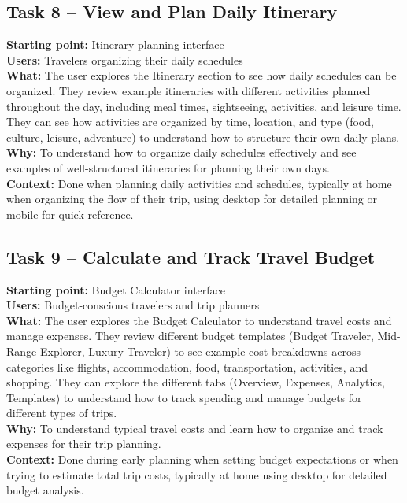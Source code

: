 \documentclass[11pt,a4paper]{article}
\begin{document}
\subsection*{Task 8 – View and Plan Daily Itinerary}
\textbf{Starting point:} Itinerary planning interface \\
\textbf{Users:} Travelers organizing their daily schedules \\
\textbf{What:} The user explores the Itinerary section to see how daily schedules can be organized. They review example itineraries with different activities planned throughout the day, including meal times, sightseeing, activities, and leisure time. They can see how activities are organized by time, location, and type (food, culture, leisure, adventure) to understand how to structure their own daily plans. \\
\textbf{Why:} To understand how to organize daily schedules effectively and see examples of well-structured itineraries for planning their own days. \\
\textbf{Context:} Done when planning daily activities and schedules, typically at home when organizing the flow of their trip, using desktop for detailed planning or mobile for quick reference.

\subsection*{Task 9 – Calculate and Track Travel Budget}
\textbf{Starting point:} Budget Calculator interface \\
\textbf{Users:} Budget-conscious travelers and trip planners \\
\textbf{What:} The user explores the Budget Calculator to understand travel costs and manage expenses. They review different budget templates (Budget Traveler, Mid-Range Explorer, Luxury Traveler) to see example cost breakdowns across categories like flights, accommodation, food, transportation, activities, and shopping. They can explore the different tabs (Overview, Expenses, Analytics, Templates) to understand how to track spending and manage budgets for different types of trips. \\
\textbf{Why:} To understand typical travel costs and learn how to organize and track expenses for their trip planning. \\
\textbf{Context:} Done during early planning when setting budget expectations or when trying to estimate total trip costs, typically at home using desktop for detailed budget analysis.
\end{document}

